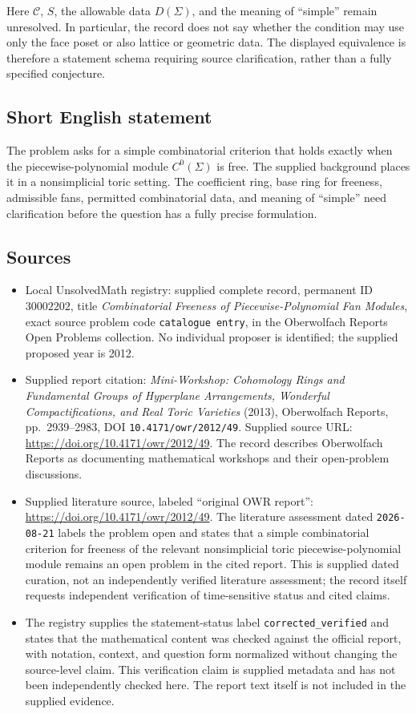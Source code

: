 \documentclass[11pt]{article}
\begin{document}
Here \(\mathcal C\), \(S\), the allowable data \(D(\Sigma)\), and the meaning of ``simple'' remain unresolved. In particular, the record does not say whether the condition may use only the face poset or also lattice or geometric data. The displayed equivalence is therefore a statement schema requiring source clarification, rather than a fully specified conjecture.
\subsection{Short English statement}
The problem asks for a simple combinatorial criterion that holds exactly when the piecewise-polynomial module \(C^0(\Sigma)\) is free. The supplied background places it in a nonsimplicial toric setting. The coefficient ring, base ring for freeness, admissible fans, permitted combinatorial data, and meaning of ``simple'' need clarification before the question has a fully precise formulation.
\subsection{Sources}
\begin{itemize}
\item Local UnsolvedMath registry: supplied complete record, permanent ID \(30002202\), title \emph{Combinatorial Freeness of Piecewise-Polynomial Fan Modules}, exact source problem code \texttt{catalogue entry}, in the Oberwolfach Reports Open Problems collection. No individual proposer is identified; the supplied proposed year is 2012.
\item Supplied report citation: \emph{Mini-Workshop: Cohomology Rings and Fundamental Groups of Hyperplane Arrangements, Wonderful Compactifications, and Real Toric Varieties} (2013), Oberwolfach Reports, pp.~2939--2983, DOI \texttt{10.4171/owr/2012/49}. Supplied source URL: \url{https://doi.org/10.4171/owr/2012/49}. The record describes Oberwolfach Reports as documenting mathematical workshops and their open-problem discussions.
\item Supplied literature source, labeled ``original OWR report'': \url{https://doi.org/10.4171/owr/2012/49}. The literature assessment dated \texttt{2026-08-21} labels the problem open and states that a simple combinatorial criterion for freeness of the relevant nonsimplicial toric piecewise-polynomial module remains an open problem in the cited report. This is supplied dated curation, not an independently verified literature assessment; the record itself requests independent verification of time-sensitive status and cited claims.
\item The registry supplies the statement-status label \texttt{corrected\_verified} and states that the mathematical content was checked against the official report, with notation, context, and question form normalized without changing the source-level claim. This verification claim is supplied metadata and has not been independently checked here. The report text itself is not included in the supplied evidence.
\end{itemize}
\end{document}
